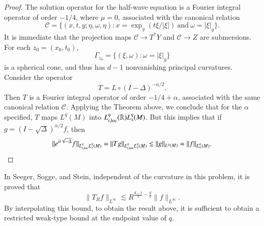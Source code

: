 \begin{proof}
    The solution operator for the half-wave equation is a Fourier integral operator of order $- 1/4$, where $\mu = 0$, associated with the canonical relation
    \[ \mathcal{C} = \{ (x,t,y; \eta, \omega, \eta) : x = \exp_y(t \xi / |\xi|)\ \text{and}\ \omega = |\xi|_g \}. \]
    It is immediate that the projection maps $\mathcal{C} \to T^* Y$ and $\mathcal{C} \to Z$ are submersions. For each $z_0 = (x_0,t_0)$,
    \[ \Gamma_{z_0} = \{ (\xi, \omega) : \omega = |\xi|_g \} \]
    is a spherical cone, and thus has $d-1$ nonvanishing principal curvatures. Consider the operator
    \[ T = L \circ (I - \Delta)^{-\alpha/2}. \]
    Then $T$ is a Fourier integral operator of order $-1/4 + \alpha$, associated with the same canonical relation $\mathcal{C}$. Applying the Theorem above, we conclude that for the $\alpha$ specified, $T$ maps $L^q(M)$ into $L^q_{t,\text{loc}}(\operatorname{\mathbb{R}}) L^q_x(M)$. But this implies that if $g = (I - \sqrt{\Delta})^{\alpha/2} f$, then
    \[ \| e^{it \sqrt{-\Delta}} f \|_{L^q_{t,\text{loc}} L^q_x(M)} = \| Tg \|_{L^q_{t,\text{loc}} L^q_x(M) } \lesssim \| g \|_{L^q(M)} = \| f \|_{L^q_\alpha(M)}. \qedhere \]
%
%
%
%
%
% 
%
%
\end{proof}

In Seeger, Sogge, and Stein, independent of the curvature in this problem, it is proved that
%
\[ \| T_R f \|_{L^\infty} \lesssim R^{ \frac{d-1}{2} - \frac{d}{q} } \| f \|_{L^\infty}. \]
%
By interpolating this bound, to obtain the result above, it is sufficient to obtain a restricted weak-type bound at the endpoint value of $q$.

